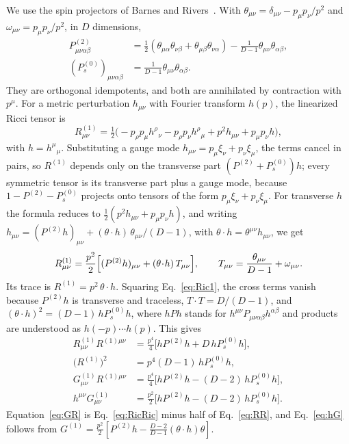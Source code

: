 \documentclass[a4paper,11pt]{article}
\newcommand{\Pt}{P^{(2)}}
\newcommand{\Ps}{P^{(0)}_{s}}
\begin{document}
We use the spin projectors of Barnes and Rivers~\cite{Rivers1964,VanNieuwenhuizen1973}. With $\theta_{\mu\nu}=\delta_{\mu\nu}-p_\mu p_\nu/p^2$ and $\omega_{\mu\nu}=p_\mu p_\nu/p^2$, in $D$ dimensions,
\begin{align*}
\Pt_{\mu\nu\alpha\beta}&=\tfrac12(\theta_{\mu\alpha}\theta_{\nu\beta}+\theta_{\mu\beta}\theta_{\nu\alpha})-\tfrac1{D-1}\theta_{\mu\nu}\theta_{\alpha\beta},\\
(\Ps)_{\mu\nu\alpha\beta}&=\tfrac1{D-1}\theta_{\mu\nu}\theta_{\alpha\beta}.
\end{align*}
They are orthogonal idempotents, and both are annihilated by contraction with $p^\mu$. For a metric perturbation $h_{\mu\nu}$ with Fourier transform $h(p)$, the linearized Ricci tensor is
\[
R^{(1)}_{\mu\nu}=\tfrac12\bigl(-p_\rho p_\mu h^\rho{}_\nu-p_\rho p_\nu h^\rho{}_\mu+p^2h_{\mu\nu}+p_\mu p_\nu h\bigr),
\]
with $h=h^\mu{}_\mu$. Substituting a gauge mode $h_{\mu\nu}=p_\mu\xi_\nu+p_\nu\xi_\mu$, the terms cancel in pairs, so $R^{(1)}$ depends only on the transverse part $(\Pt+\Ps)h$; every symmetric tensor is its transverse part plus a gauge mode, because $1-\Pt-\Ps$ projects onto tensors of the form $p_\mu\xi_\nu+p_\nu\xi_\mu$. For transverse $h$ the formula reduces to $\frac12(p^2h_{\mu\nu}+p_\mu p_\nu h)$, and writing $h_{\mu\nu}=(\Pt h)_{\mu\nu}+(\theta\cdot h)\,\theta_{\mu\nu}/(D-1)$, with $\theta\cdot h=\theta^{\mu\nu}h_{\mu\nu}$, we get
\begin{equation}
\label{eq:Ric1}
R^{(1)}_{\mu\nu}=\frac{p^2}2\Bigl[(\Pt h)_{\mu\nu}+(\theta\!\cdot\!h)\,T_{\mu\nu}\Bigr],\qquad T_{\mu\nu}=\frac{\theta_{\mu\nu}}{D-1}+\omega_{\mu\nu}.
\end{equation}
Its trace is $R^{(1)}=p^2\,\theta\cdot h$. Squaring Eq.~\eqref{eq:Ric1}, the cross terms vanish because $\Pt h$ is transverse and traceless, $T\cdot T=D/(D-1)$, and $(\theta\cdot h)^2=(D-1)\,h\Ps h$, where $hPh$ stands for $h^{\mu\nu}P_{\mu\nu\alpha\beta}h^{\alpha\beta}$ and products are understood as $h(-p)\cdots h(p)$. This gives
\begin{align}
R^{(1)}_{\mu\nu}R^{(1)\mu\nu}&=\tfrac{p^4}4\bigl[h\Pt h+D\,h\Ps h\bigr],\label{eq:RicRic}\\
\bigl(R^{(1)}\bigr)^2&=p^4(D-1)\,h\Ps h,\label{eq:RR}\\
G^{(1)}_{\mu\nu}R^{(1)\mu\nu}&=\tfrac{p^4}4\bigl[h\Pt h-(D-2)\,h\Ps h\bigr],\label{eq:GR}\\
h^{\mu\nu}G^{(1)}_{\mu\nu}&=\tfrac{p^2}2\bigl[h\Pt h-(D-2)\,h\Ps h\bigr].\label{eq:hG}
\end{align}
Equation~\eqref{eq:GR} is Eq.~\eqref{eq:RicRic} minus half of Eq.~\eqref{eq:RR}, and Eq.~\eqref{eq:hG} follows from $G^{(1)}=\frac{p^2}2[\Pt h-\frac{D-2}{D-1}(\theta\cdot h)\theta]$.
\end{document}
